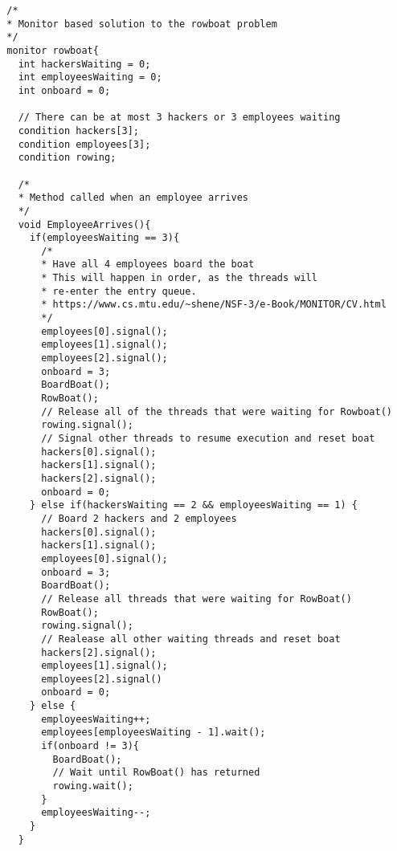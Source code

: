 \documentclass{article}
\begin{document}
\begin{lstlisting}
  /*
  * Monitor based solution to the rowboat problem
  */
  monitor rowboat{
    int hackersWaiting = 0;
    int employeesWaiting = 0;
    int onboard = 0;

    // There can be at most 3 hackers or 3 employees waiting
    condition hackers[3];
    condition employees[3];
    condition rowing;

    /*
    * Method called when an employee arrives
    */
    void EmployeeArrives(){
      if(employeesWaiting == 3){
        /*
        * Have all 4 employees board the boat
        * This will happen in order, as the threads will
        * re-enter the entry queue.
        * https://www.cs.mtu.edu/~shene/NSF-3/e-Book/MONITOR/CV.html
        */
        employees[0].signal();
        employees[1].signal();
        employees[2].signal();
        onboard = 3;
        BoardBoat();
        RowBoat();
        // Release all of the threads that were waiting for Rowboat()
        rowing.signal();
        // Signal other threads to resume execution and reset boat
        hackers[0].signal();
        hackers[1].signal();
        hackers[2].signal();
        onboard = 0;
      } else if(hackersWaiting == 2 && employeesWaiting == 1) {
        // Board 2 hackers and 2 employees
        hackers[0].signal();
        hackers[1].signal();
        employees[0].signal();
        onboard = 3;
        BoardBoat();
        // Release all threads that were waiting for RowBoat()
        RowBoat();
        rowing.signal();
        // Realease all other waiting threads and reset boat
        hackers[2].signal();
        employees[1].signal();
        employees[2].signal()
        onboard = 0;
      } else {
        employeesWaiting++;
        employees[employeesWaiting - 1].wait();
        if(onboard != 3){
          BoardBoat();
          // Wait until RowBoat() has returned
          rowing.wait();
        }
        employeesWaiting--;
      }
    }


\end{lstlisting}
\end{document}
